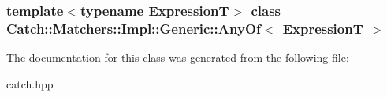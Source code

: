 \subsubsection*{template$<$typename ExpressionT$>$ class Catch::Matchers::Impl::Generic::AnyOf$<$ ExpressionT $>$}



The documentation for this class was generated from the following file:\begin{DoxyCompactItemize}
\item 
catch.hpp\end{DoxyCompactItemize}

